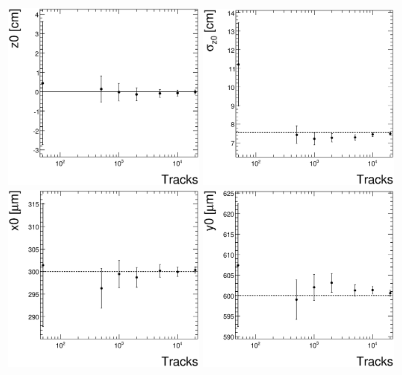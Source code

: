 \documentclass{cmspaper}
\begin{document}
\begin{figure}[hbtp]
  \begin{center}
        \includegraphics[width=0.45\textwidth]{figures/fxy_lhfit_dz.eps}
        \includegraphics[width=0.45\textwidth]{figures/fxy_lhfit_sigmadz.eps}
        \includegraphics[width=0.45\textwidth]{figures/fxy_lhfit_x0.eps}
        \includegraphics[width=0.45\textwidth]{figures/fxy_lhfit_y0.eps}

\end{center}
\end{figure}
\end{document}
